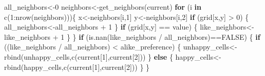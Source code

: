 \documentclass[]{tufte-book}
\newenvironment{Shaded}{}{}
\newcommand{\ConstantTok}[1]{\textcolor[rgb]{0.53,0.00,0.00}{#1}}
\newcommand{\ControlFlowTok}[1]{\textcolor[rgb]{0.00,0.44,0.13}{\textbf{#1}}}
\newcommand{\DecValTok}[1]{\textcolor[rgb]{0.25,0.63,0.44}{#1}}
\newcommand{\FunctionTok}[1]{\textcolor[rgb]{0.02,0.16,0.49}{#1}}
\newcommand{\NormalTok}[1]{#1}
\newcommand{\OtherTok}[1]{\textcolor[rgb]{0.00,0.44,0.13}{#1}}
\newcommand{\SpecialCharTok}[1]{\textcolor[rgb]{0.25,0.44,0.63}{#1}}
\begin{document}
\begin{Shaded}
\begin{Highlighting}[]
\NormalTok{                                all\_neighbors}\OtherTok{\textless{}{-}}\DecValTok{0}
\NormalTok{                                neighbors}\OtherTok{\textless{}{-}}\FunctionTok{get\_neighbors}\NormalTok{(current)}
                                \ControlFlowTok{for}\NormalTok{ (i }\ControlFlowTok{in} \FunctionTok{c}\NormalTok{(}\DecValTok{1}\SpecialCharTok{:}\FunctionTok{nrow}\NormalTok{(neighbors)))\{}
\NormalTok{                                        x}\OtherTok{\textless{}{-}}\NormalTok{neighbors[i,}\DecValTok{1}\NormalTok{]}
\NormalTok{                                        y}\OtherTok{\textless{}{-}}\NormalTok{neighbors[i,}\DecValTok{2}\NormalTok{]}
                                        \ControlFlowTok{if}\NormalTok{ (grid[x,y] }\SpecialCharTok{\textgreater{}} \DecValTok{0}\NormalTok{) \{}
\NormalTok{                                                all\_neighbors}\OtherTok{\textless{}{-}}\NormalTok{all\_neighbors }\SpecialCharTok{+} \DecValTok{1}
\NormalTok{                                        \}}
                                        \ControlFlowTok{if}\NormalTok{ (grid[x,y] }\SpecialCharTok{==}\NormalTok{ value) \{}
\NormalTok{                                                like\_neighbors}\OtherTok{\textless{}{-}}\NormalTok{like\_neighbors }\SpecialCharTok{+} \DecValTok{1}
\NormalTok{                                        \}}
\NormalTok{                                \}}
                                \ControlFlowTok{if}\NormalTok{ (}\FunctionTok{is.nan}\NormalTok{(like\_neighbors }\SpecialCharTok{/}\NormalTok{ all\_neighbors)}\SpecialCharTok{==}\ConstantTok{FALSE}\NormalTok{) \{}
                                        \ControlFlowTok{if}\NormalTok{ ((like\_neighbors }\SpecialCharTok{/}\NormalTok{ all\_neighbors) }\SpecialCharTok{\textless{}}\NormalTok{ alike\_preference) \{}
\NormalTok{                                                unhappy\_cells}\OtherTok{\textless{}{-}}\FunctionTok{rbind}\NormalTok{(unhappy\_cells,}\FunctionTok{c}\NormalTok{(current[}\DecValTok{1}\NormalTok{],current[}\DecValTok{2}\NormalTok{]))}
\NormalTok{                                        \}}
                                        \ControlFlowTok{else}\NormalTok{ \{}
\NormalTok{                                                happy\_cells}\OtherTok{\textless{}{-}}\FunctionTok{rbind}\NormalTok{(happy\_cells,}\FunctionTok{c}\NormalTok{(current[}\DecValTok{1}\NormalTok{],current[}\DecValTok{2}\NormalTok{]))}
\NormalTok{                                        \}}
\NormalTok{                                \}}
                                

\end{Highlighting}
\end{Shaded}
\end{document}
